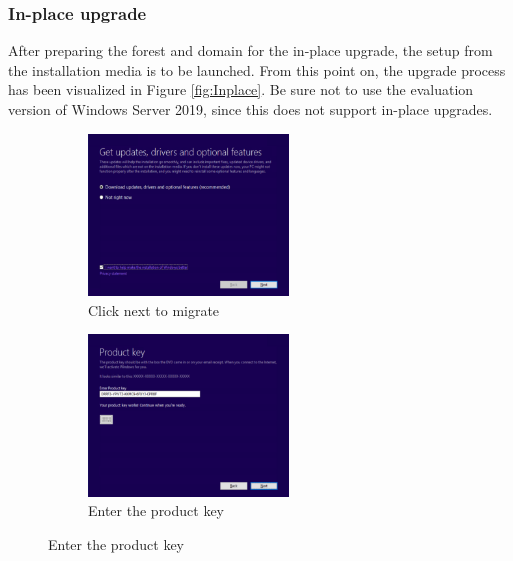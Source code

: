 \subsubsection{In-place upgrade}
\label{sssec:In-place_upgrade}
After preparing the forest and domain for the in-place upgrade, the setup from the installation media is to be launched. 
From this point on, the upgrade process has been visualized in Figure \ref{fig:Inplace}. 
Be sure not to use the evaluation version of Windows Server 2019, since this does not support in-place upgrades.

\begin{figure}[h]
	\begin{subfigure}{0.5\textwidth}
		\includegraphics[width=0.9\linewidth,height=4.3cm]{img/Methodologie/InPlace0.png}
		\captionsetup{width=0.8\linewidth}
		\centering		
		\caption{Click next to migrate}
	\end{subfigure}
	\begin{subfigure}{0.5\textwidth}
		\captionsetup{width=0.8\linewidth}
		\includegraphics[width=0.9\linewidth,height=4.3cm]{img/Methodologie/InPlace1.png}
		\centering
		\caption{Enter the product key}
	\end{subfigure}
\end{figure}
